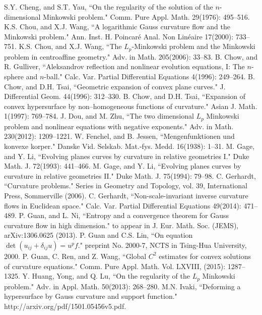 \documentclass{amsart}
\theoremstyle{definition}
\theoremstyle{remark}
\numberwithin{equation}{section}
\begin{document}
\begin{thebibliography}{10}
 S.Y. Cheng, and S.T. Yau, ``On the regularity of the solution of the $n$-dimensional Minkowski problem." Comm. Pure Appl. Math. 29(1976): 495--516.
 K.S. Chou, and X.J. Wang, ``A logarithmic Gauss curvature flow and the Minkowski problem." Ann. Inst. H. Poincar\'{e} Anal. Non Lin\'{e}aire 17(2000): 733--751.
 K.S. Chou, and X.J. Wang, ``The $L_p$-Minkowski problem and the Minkowski problem in centroaffine geometry." Adv. in Math. 205(2006): 33--83.
 B. Chow, and R. Gulliver, ``Aleksandrov reflection and nonlinear evolution equations, I: The $n$-sphere and $n$-ball." Calc. Var. Partial Differential Equations 4(1996): 249--264.
 B. Chow, and D.H. Tsai, ``Geometric expansion of convex plane curves." J. Differential Geom. 44(1996): 312--330.
 B. Chow, and D.H. Tsai, ``Expansion of convex hypersurface by non--homogeneous functions of curvature." Asian J. Math. 1(1997): 769--784.
J. Dou, and  M. Zhu, ``The two dimensional $L_p$ Minkowski problem and nonlinear equations with negative exponents." Adv. in Math. 230(2012): 1209--1221.
 W. Fenchel, and B. Jessen, ``Mengenfunktionen und konvexe korper." Danske Vid. Selskab. Mat.-fys. Medd. 16(1938): 1--31.
 M. Gage, and Y. Li, ``Evolving planes curves by curvature in relative geometries I." Duke Math. J. 72(1993): 441--466.
 M. Gage, and Y. Li,  ``Evolving planes curves by curvature in relative geometries II." Duke Math. J. 75(1994): 79--98.
 C. Gerhardt, ``Curvature problems." Series in Geometry and Topology, vol. 39, International Press, Sommerville (2006).
 C. Gerhardt, ``Non-scale-invariant inverse curvature flows in Euclidean space." Calc. Var. Partial Differential Equations 49(2014): 471--489.
 P. Guan, and L. Ni, ``Entropy and a convergence theorem for Gauss curvature flow in high dimension."  to appear in J. Eur. Math. Soc. (JEMS), arXiv:1306.0625 (2013).
  P. Guan and C.S. Lin, ``On equation $\det(u_{ij} + \delta_{ij}u) = u^p f$." preprint No. 2000-7, NCTS in Tsing-Hua University, 2000.
P. Guan, C. Ren, and Z. Wang, ``Global $C^2$ estimates for convex solutions of curvature equations." Comm. Pure Appl. Math. Vol. LXVIII, (2015): 1287--1325.
Y. Huang, Yong, and Q. Lu, ``On the regularity of the $L_p$ Minkowski problem." Adv. in Appl. Math. 50(2013): 268--280.
 M.N. Ivaki, ``Deforming a hypersurface by Gauss curvature and support function." http://arxiv.org/pdf/1501.05456v5.pdf.

\end{thebibliography}
\end{document}
